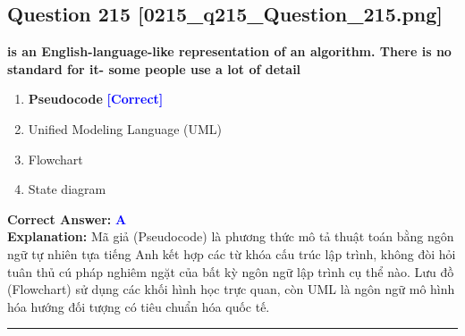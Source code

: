 \documentclass[11pt,a4paper]{article}
\begin{document}
\begin{minipage}{\textwidth}
\subsection*{Question 215 \quad \footnotesize{[0215\_q215\_Question\_215.png]}}
\noindent \textbf{is an English-language-like representation of an algorithm. There is no standard for it- some people use a lot of detail}

\begin{enumerate}[label=\Alph*.]
    \item \textbf{Pseudocode} \hfill \textcolor{blue}{\textbf{[Correct]}}
    \item Unified Modeling Language (UML)
    \item Flowchart
    \item State diagram
\end{enumerate}

\noindent \textbf{Correct Answer:} \textcolor{blue}{\textbf{A}} \\[2pt]
\noindent \textbf{Explanation:} Mã giả (Pseudocode) là phương thức mô tả thuật toán bằng ngôn ngữ tự nhiên tựa tiếng Anh kết hợp các từ khóa cấu trúc lập trình, không đòi hỏi tuân thủ cú pháp nghiêm ngặt của bất kỳ ngôn ngữ lập trình cụ thể nào. Lưu đồ (Flowchart) sử dụng các khối hình học trực quan, còn UML là ngôn ngữ mô hình hóa hướng đối tượng có tiêu chuẩn hóa quốc tế.

\par\vspace{0.3cm}
\hrule
\vspace{0.3cm}
\end{minipage}
\end{document}
